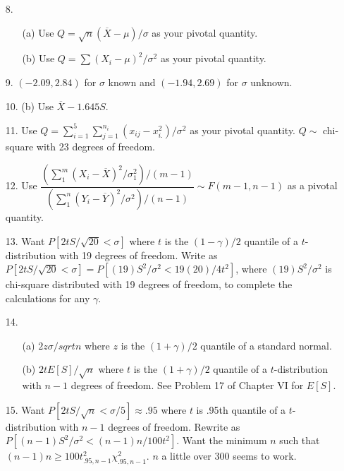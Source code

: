 \begin{enumerate}
	\item[8.] \begin{enumerate}
		\item[(a)] Use $Q=\sqrt{n}(\overline{X}-\mu)/\sigma$ as your pivotal quantity.
		\item[(b)] Use $Q= \sum(X_i-\mu)^2/\sigma^2$ as your pivotal quantity.
	\end{enumerate}

	\newpage
	\item[9.] $(-2.09, 2.84)$ for $\sigma$ known and $(-1.94,2.69)$ for $\sigma$ unknown.
	
	\item[10.] (b) Use $\overline{X} - 1.645S$.
	
	\item[11.] Use $Q = \sum\limits_{i=1}^5\sum\limits_{j=1}^{n_i}(x_{ij}-x_{i.}^2)/\sigma^2$ as your pivotal quantity. $Q\sim$ chi-square with 23 degrees of freedom.
	
	\item[12.] Use $\dfrac{\left(\sum\limits_1^m(X_i-\overline{X})^2/\sigma_1^2\right)/(m-1)}{\left(\sum\limits_1^n(Y_i-\overline{Y})^2/\sigma^2\right)/(n-1)} \sim F(m-1,n-1)$ as a pivotal quantity. 
	
	\item[13.] Want $P[2tS/\sqrt{20} < \sigma]$ where $t$ is the $(1-\gamma)/2$ quantile of a $t$-distribution with 19 degrees of freedom. Write as $P[2tS/\sqrt{20} < \sigma] = P[(19)S^2/\sigma^2 < 19(20)/4t^2]$, where $(19)S^2/\sigma^2$ is chi-square distributed with 19 degrees of freedom, to complete the calculations for any $\gamma$.
	
	\item[14.] \begin{enumerate}
		\item[(a)] $2z\sigma/sqrt{n}$ where $z$ is the $(1+\gamma)/2$ quantile of a standard normal.
		\item[(b)] $2tE[S]/\sqrt{n}$ where $t$ is the $(1+\gamma)/2$ quantile of a $t$-distribution with $n-1$ degrees of freedom. See Problem 17 of Chapter VI for $E[S]$.
	\end{enumerate}
	
	\item[15.] Want $P[2tS/\sqrt{n} < \sigma/5] \approx .95$ where $t$ is .95th quantile of a $t$-distribution with $n-1$ degrees of freedom. Rewrite as $P[(n-1)S^2/\sigma^2 < (n-1)n/100t^2]$. Want the minimum $n$ such that $(n-1)n \ge 100t^2_{.95,n-1}\chi^2_{.95,n-1}$. $n$ a little over 300 seems to work.
	

\end{enumerate}
